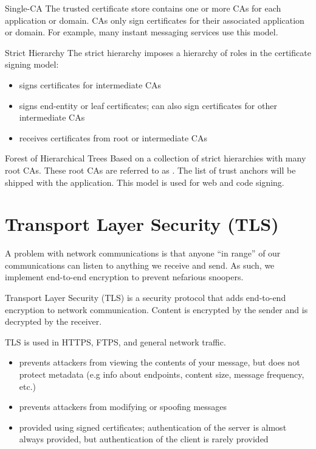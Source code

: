 \begin{exbox}{Single-CA}{}
    The trusted certificate store contains one or more CAs for each application or domain. CAs only sign certificates for their associated application or domain. For example, many instant messaging services use this model.
\end{exbox}

\begin{exbox}{Strict Hierarchy}{}
    The strict hierarchy imposes a hierarchy of roles in the certificate signing model:
    \begin{itemize}[noitemsep]
        \item {} signs certificates for intermediate CAs
        \item {} signs end-entity or leaf certificates; can also sign certificates for other intermediate CAs
        \item {} receives certificates from root or intermediate CAs
    \end{itemize}
\end{exbox}

\begin{exbox}{Forest of Hierarchical Trees}{}
    Based on a collection of strict hierarchies with many root CAs. These root CAs are referred to as . The list of trust anchors will be shipped with the application. This model is used for web and code signing.
\end{exbox}

\section{Transport Layer Security (TLS)}

A problem with network communications is that anyone ``in range'' of our communications can listen to anything we receive and send. As such, we implement end-to-end encryption to prevent nefarious snoopers.

\begin{dfnbox}{Transport Layer Security (TLS)}{}
     is a security protocol that adds end-to-end encryption to network communication. Content is encrypted by the sender and is decrypted by the receiver.
\end{dfnbox}

TLS is used in HTTPS, FTPS, and general network traffic.

\begin{itemize}
    \item {} prevents attackers from viewing the contents of your message, but does not protect metadata (e.g info about endpoints, content size, message frequency, etc.)
    \item {} prevents attackers from modifying or spoofing messages
    \item {} provided using signed certificates; authentication of the server is almost always provided, but authentication of the client is rarely provided
\end{itemize}

